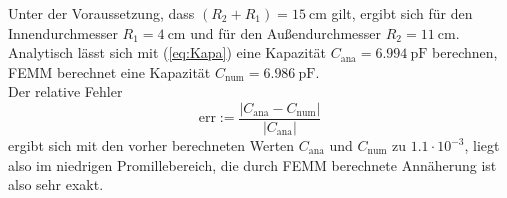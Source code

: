Unter der Voraussetzung, dass $(R_2+R_1) = \SI{15}{\centi\meter}$ gilt, ergibt sich für den Innendurchmesser $R_1 = \SI{4}{\centi\meter}$ und für den Außendurchmesser $R_2 = \SI{11}{\centi\meter}$. Analytisch lässt sich mit (\ref{eq:Kapa}) eine Kapazität $C_{\mathrm{ana}} = \SI{6,994}{\pico\farad}$ berechnen, FEMM berechnet eine Kapazität $C_{\mathrm{num}} = \SI{6,986}{\pico\farad}$. \\
Der relative Fehler
\begin{equation}
	\mathrm{err :=} \frac{|C_{\mathrm{ana}}-C_{\mathrm{num}}|}{|C_{\mathrm{ana}}|}
	\label{eq:err}
\end{equation}
ergibt sich mit den vorher berechneten Werten $C_{\mathrm{ana}}$ und $C_{\mathrm{num}}$ zu $1.1 \cdot 10^{-3}$, liegt also im niedrigen Promillebereich, die durch FEMM berechnete Annäherung ist also sehr exakt.